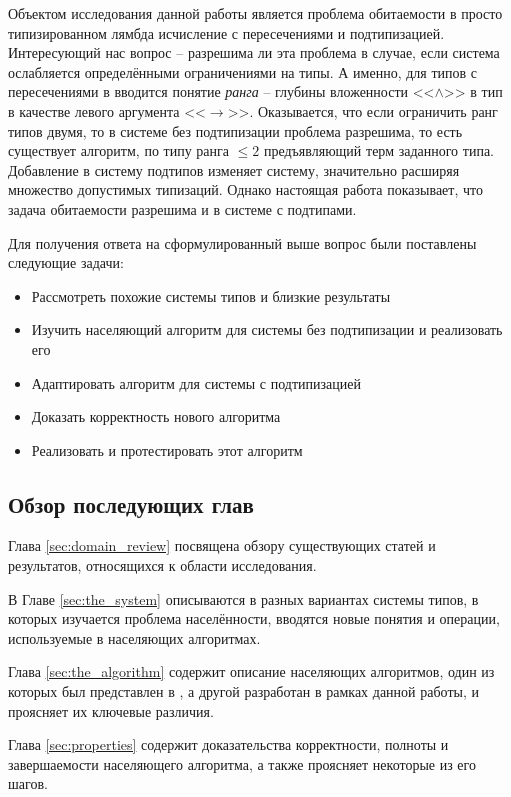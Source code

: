 \documentclass[../main.tex]{subfiles}
\begin{document}
\emptyline

Объектом исследования данной работы является проблема обитаемости в просто типизированном лямбда исчисление с пересечениями и подтипизацией. Интересующий нас вопрос -- разрешима ли эта проблема в случае, если система ослабляется определёнными ограничениями на типы. А именно, для типов с пересечениями в \cite{leivant_1983} вводится понятие {\it ранга} -- глубины вложенности <<$\wedge$>> в тип в качестве левого аргумента <<$\to$>>. Оказывается, что если ограничить ранг типов двумя, то в системе без подтипизации проблема разрешима, то есть существует алгоритм, по типу ранга $\leqslant 2$ предъявляющий терм заданного типа. Добавление в систему подтипов изменяет систему, значительно расширяя множество допустимых типизаций. Однако настоящая работа показывает, что задача обитаемости разрешима и в системе с подтипами.

Для получения ответа на сформулированный выше вопрос были поставлены следующие задачи: 
\begin{itemize}
    \item Рассмотреть похожие системы типов и близкие результаты
    \item Изучить населяющий алгоритм для системы без подтипизации и реализовать его
    \item Адаптировать алгоритм для системы с подтипизацией
    \item Доказать корректность нового алгоритма
    \item Реализовать и протестировать этот алгоритм
    
\end{itemize}

\subsection*{Обзор последующих глав}
Глава \ref{sec:domain_review} посвящена обзору существующих статей и результатов, относящихся к области исследования. 

В Главе \ref{sec:the_system} описываются в разных вариантах системы типов, в которых изучается проблема населённости, вводятся новые понятия и операции, используемые в населяющих алгоритмах.

Глава \ref{sec:the_algorithm} содержит описание населяющих алгоритмов, один из которых был представлен в \cite{kusmierek_2007}, а другой разработан в рамках данной работы, и проясняет их ключевые различия.

Глава \ref{sec:properties} содержит доказательства корректности, полноты и завершаемости населяющего алгоритма, а также проясняет некоторые из его шагов. 
\end{document}
